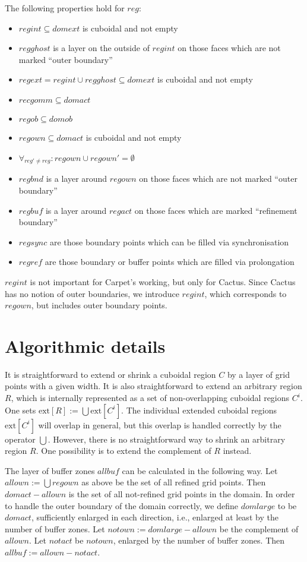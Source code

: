 \documentclass[oneside]{amsart}
\begin{document}
The following properties hold for $reg$:
\begin{itemize}
\item $regint \subseteq domext$ is cuboidal and not empty
\item $regghost$ is a layer on the outside of $regint$ on those faces
  which are not marked ``outer boundary''
\item $regext = regint \cup regghost \subseteq domext$ is cuboidal and
  not empty
\item $recgomm \subseteq domact$
\item $regob \subseteq domob$
\item $regown \subseteq domact$ is cuboidal and not empty
\item $\forall_{reg' \ne reg}: regown \cup regown' = \emptyset$
\item $regbnd$ is a layer around $regown$ on those faces which are not
  marked ``outer boundary''
\item $regbuf$ is a layer around $regact$ on those faces which are
  marked ``refinement boundary''
\item $regsync$ are those boundary points which can be filled via
  synchronisation
\item $regref$ are those boundary or buffer points which are filled
  via prolongation
\end{itemize}
$regint$ is not important for Carpet's working, but only for Cactus.
Since Cactus has no notion of outer boundaries, we introduce $regint$,
which corresponds to $regown$, but includes outer boundary points.



\section{Algorithmic details}

It is straightforward to extend or shrink a cuboidal region $C$ by a
layer of grid points with a given width.  It is also straightforward
to extend an arbitrary region $R$, which is internally represented as
a set of non-overlapping cuboidal regions ${C^i}$.  One sets
$\mathrm{ext}[R] := \bigcup \mathrm{ext}[C^i]$.  The individual
extended cuboidal regions $\mathrm{ext}[C^i]$ will overlap in general,
but this overlap is handled correctly by the operator $\bigcup$.
However, there is no straightforward way to shrink an arbitrary region
$R$.  One possibility is to extend the complement of $R$ instead.

The layer of buffer zones $allbuf$ can be calculated in the following
way.  Let $allown := \bigcup regown$ as above be the set of all
refined grid points.  Then $domact - allown$ is the set of all
not-refined grid points in the domain.  In order to handle the outer
boundary of the domain correctly, we define $domlarge$ to be $domact$,
sufficiently enlarged in each direction, i.e., enlarged at least by
the number of buffer zones.  Let $notown := domlarge - allown$ be the
complement of $allown$.  Let $notact$ be $notown$, enlarged by the
number of buffer zones.  Then $allbuf := allown - notact$.
\end{document}
